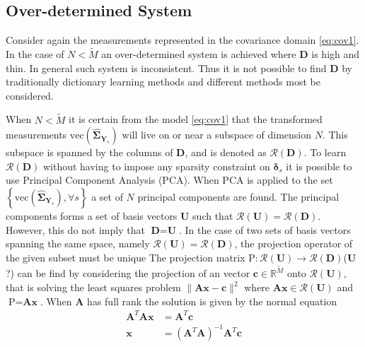 \subsection{Over-determined System}\label{sec:over_det}
Consider again the measurements represented in the covariance domain \eqref{eq:cov1}.
In the case of $N < \widetilde{M}$ an over-determined system is achieved where $\textbf{D}$ is high and thin. In general such system is inconsistent. Thus it is not possible to find $\textbf{D}$ by traditionally dictionary learning methods and different methods most be considered.

When $N < \widetilde{M}$ it is certain from the model \eqref{eq:cov1} that the transformed measurements $\text{vec}(\widehat{\boldsymbol{\Sigma}}_{\textbf{Y}_s})$ will live on or near a subspace of dimension $N$. 
This subspace is spanned by the columns of $\textbf{D}$, and is denoted as $\mathcal{R}(\textbf{D})$. 
To learn $\mathcal{R}(\textbf{D})$ without having to impose any sparsity constraint on $\boldsymbol{\delta}_s$ it is possible to use Principal Component Analysis (PCA). 
When PCA is applied to the set $\left\{\text{vec}(\widehat{\boldsymbol{\Sigma}}_{\textbf{Y}_s}), \forall s \right\}$ a set of $N$ principal components are found. The principal components forms a set of basis vectors $\textbf{U}$ such that $\mathcal{R}(\textbf{U})=\mathcal{R}(\textbf{D})$. 
However, this do not imply that $\textbf{D}=\textbf{U}$. 
In the case of two sets of basis vectors spanning the same space, namely $\mathcal{R}(\textbf{U})=\mathcal{R}(\textbf{D})$, the projection operator of the given subset must be unique   
The projection matrix $\text{P}:\mathcal{R}(\textbf{U})\rightarrow \mathcal{R}(\textbf{D})$($\textbf{U}$?) can be find by considering the projection of an vector $\textbf{c}\in \mathbb{R}^{\widetilde{M}}$ onto $\mathcal{R}(\textbf{U})$, that is solving the least squares problem $\| \textbf{Ax}-\textbf{c}\|^{2}$ where $\textbf{Ax}\in \mathcal{R}(\textbf{U})$ and $\text{P} = \textbf{Ax}$. When $\textbf{A}$ has full rank the solution is given by the normal equation
\begin{align*}
\textbf{A}^T\textbf{A}\textbf{x} &= \textbf{A}^T\textbf{c}\\
\textbf{x} &= (\textbf{A}^T\textbf{A})^{-1}\textbf{A}^T\textbf{c}
\end{align*}	
